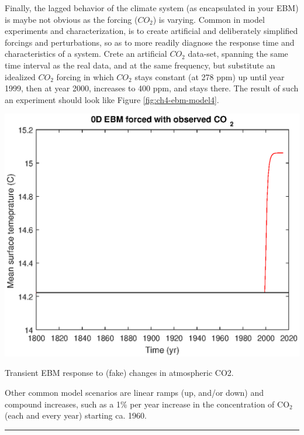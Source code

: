 \documentclass{tufte-book} %
\begin{document}
Finally, the lagged behavior of the climate system (as encapsulated in your EBM) is maybe not obvious as the forcing (\(CO_{2}\)) is varying. Common in model experiments and characterization, is to create artificial and deliberately simplified forcings and perturbations, so as to more readily diagnose the response time and characteristics of a system. Crete an artificial \(CO_{2}\) data-set, spanning the same time interval as the real data, and at the same frequency, but substitute an idealized \(CO_{2}\) forcing in which \(CO_{2}\) stays constant (at 278 ppm) up until year 1999, then at year 2000, increases to 400 ppm, and stays there. The result of such an experiment should look like Figure \ref{fig:ch4-ebm-model4}.
 
\begin{marginfigure}[-0.0in]
\includegraphics[width=\linewidth]{ch4-ebm-model4.eps}
\caption{Transient EBM response to (fake) changes in atmospheric CO2.}
\label{fig:ch4-ebm-model4}
\end{marginfigure}

Other common model scenarios are linear ramps (up, and/or down) and compound increases, such as a 1\%  per year increase in the concentration of CO\(_{2}\) (each and every year) starting ca. 1960.


\vspace{1mm}
\noindent\rule{4cm}{0.5pt}
\vspace{2mm}
\end{document}
